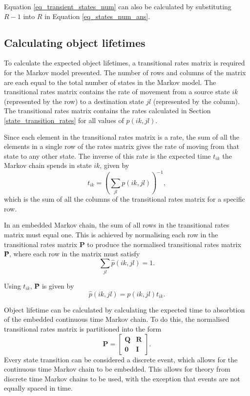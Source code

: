 Equation \eqref{eq_transient_states_num} can also be calculated by substituting $R-1$ into $R$ in Equation \eqref{eq_states_num_ans}.

\subsection{Calculating object lifetimes}

To calculate the expected object lifetimes, a transitional rates matrix is required for the Markov model presented. The number of rows and columns of the matrix are each equal to the total number of states in the Markov model. The transitional rates matrix contains the rate of movement from a source state $ik$ (represented by the row) to a destination state $jl$ (represented by the column). The transitional rates matrix contains the rates calculated in Section \ref{state_transition_rates} for all values of $p(ik, jl)$.

Since each element in the transitional rates matrix is a rate, the sum of all the elements in a single row of the rates matrix gives the rate of moving from that state to any other state. The inverse of this rate is the expected time $t_{ik}$ the Markov chain spends in state $ik$, given by
%
\begin{equation} \label{eq_markov_rates}
    t_{ik} = \left(\sum_{jl} p(ik, jl)\right)^{-1},
\end{equation}
%
which is the sum of all the columns of the transitional rates matrix for a specific row.

In an embedded Markov chain, the sum of all rows in the transitional rates matrix must equal one. This is achieved by normalising each row in the transitional rates matrix \textbf{P} to produce the normalised transitional rates matrix \textbf{\^{P}}, where each row in the matrix must satisfy
%
\begin{equation} \label{eq_markov_sum}
    \sum_{jl} \hat{p}(ik, jl) = 1.
\end{equation}

Using $t_{ik}$, \textbf{\^{P}} is given by
%
\begin{equation} \label{eq_markov_normalisation}
    \hat{p}(ik, jl) = p(ik, jl) t_{ik}.
\end{equation}

Object lifetime can be calculated by calculating the expected time to absorbtion of the embedded continuous time Markov chain. To do this, the normalised transitional rates matrix is partitioned into the form
%
\begin{equation} \label{matrix_partition}
    \textbf{\^{P}} = \left[\begin{array}{c|c}
                   \textbf{Q} & \textbf{R} \\
                   \hline
                   \textbf{0} & \textbf{I}
                 \end{array}\right].
\end{equation}
%
Every state transition can be considered a discrete event, which allows for the continuous time Markov chain to be embedded. This allows for theory from discrete time Markov chains to be used, with the exception that events are not equally spaced in time.

